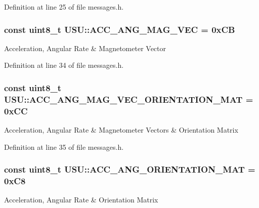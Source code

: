 \-Definition at line 25 of file messages.\-h.

\hypertarget{namespace_u_s_u_ad03e7c0f41fd47a68a9f33abde73932a}{
\subsubsection[{\-A\-C\-C\-\_\-\-A\-N\-G\-\_\-\-M\-A\-G\-\_\-\-V\-E\-C}]{\setlength{\rightskip}{0pt plus 5cm}const uint8\-\_\-t {\bf \-U\-S\-U\-::\-A\-C\-C\-\_\-\-A\-N\-G\-\_\-\-M\-A\-G\-\_\-\-V\-E\-C} = 0x\-C\-B}}\label{namespace_u_s_u_ad03e7c0f41fd47a68a9f33abde73932a}
\-Acceleration, \-Angular \-Rate \& \-Magnetometer \-Vector 

\-Definition at line 34 of file messages.\-h.

\hypertarget{namespace_u_s_u_adb9724de65ce9a212dd8611f69d241f0}{
\subsubsection[{\-A\-C\-C\-\_\-\-A\-N\-G\-\_\-\-M\-A\-G\-\_\-\-V\-E\-C\-\_\-\-O\-R\-I\-E\-N\-T\-A\-T\-I\-O\-N\-\_\-\-M\-A\-T}]{\setlength{\rightskip}{0pt plus 5cm}const uint8\-\_\-t {\bf \-U\-S\-U\-::\-A\-C\-C\-\_\-\-A\-N\-G\-\_\-\-M\-A\-G\-\_\-\-V\-E\-C\-\_\-\-O\-R\-I\-E\-N\-T\-A\-T\-I\-O\-N\-\_\-\-M\-A\-T} = 0x\-C\-C}}\label{namespace_u_s_u_adb9724de65ce9a212dd8611f69d241f0}
\-Acceleration, \-Angular \-Rate \& \-Magnetometer \-Vectors \& \-Orientation \-Matrix 

\-Definition at line 35 of file messages.\-h.

\hypertarget{namespace_u_s_u_a13f66b9f78d1a3e9778bce391ab41b5e}{
\subsubsection[{\-A\-C\-C\-\_\-\-A\-N\-G\-\_\-\-O\-R\-I\-E\-N\-T\-A\-T\-I\-O\-N\-\_\-\-M\-A\-T}]{\setlength{\rightskip}{0pt plus 5cm}const uint8\-\_\-t {\bf \-U\-S\-U\-::\-A\-C\-C\-\_\-\-A\-N\-G\-\_\-\-O\-R\-I\-E\-N\-T\-A\-T\-I\-O\-N\-\_\-\-M\-A\-T} = 0x\-C8}}\label{namespace_u_s_u_a13f66b9f78d1a3e9778bce391ab41b5e}
\-Acceleration, \-Angular \-Rate \& \-Orientation \-Matrix 

